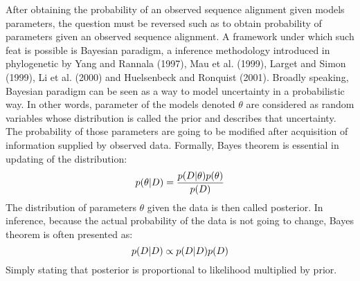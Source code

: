 After obtaining the probability of an observed sequence alignment given models parameters, the question must be reversed such as to obtain probability of parameters given an observed sequence alignment.
A framework under which such feat is possible is Bayesian paradigm, a inference methodology introduced in phylogenetic by Yang and Rannala (1997), Mau et al. (1999), Larget and Simon (1999), Li et al. (2000) and Huelsenbeck and Ronquist (2001).
Broadly speaking, Bayesian paradigm can be seen as a way to model uncertainty in a probabilistic way.
In other words, parameter of the models denoted $\theta$ are considered as random variables whose distribution is called the \gls{prior} and describes that uncertainty.
The probability of those parameters are going to be modified after acquisition of information supplied by observed data.
Formally, Bayes theorem is essential in updating of the distribution:
\begin{equation}
	p(\theta|D)=\frac{p(D|\theta)p(\theta)}{p(D)}
\end{equation}
The distribution of parameters $\theta$ given the data is then called \gls{posterior}.
In inference, because the actual probability of the data is not going to change, Bayes theorem is often presented as:
\begin{equation}
p(D|D) \propto p(D|D)p(D)
\end{equation}
Simply stating that \gls{posterior} is proportional to \gls{likelihood} multiplied by \gls{prior}.

